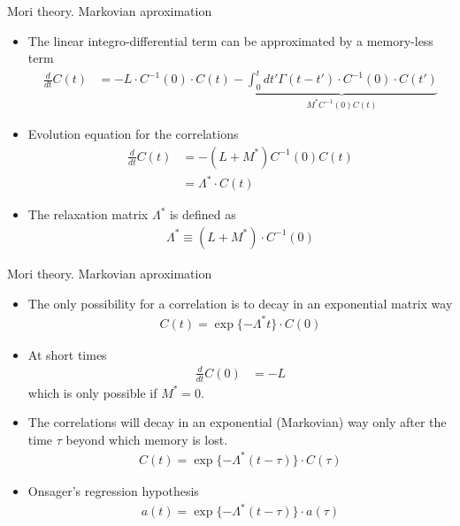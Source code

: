 \documentclass{beamer}
\newcommand{\esc}{\!\cdot\!}
\begin{document}
\begin{frame}{Mori theory. Markovian aproximation}
  \begin{itemize}
    \item The linear integro-differential term can be approximated by a memory-less term
      \begin{align}
  \frac{d}{dt}C(t)&=-L\esc C^{-1}(0)\esc C(t)
  -\underbrace{\int_0^tdt' \Gamma(t-t')\esc C^{-1}(0)\esc  C(t')}_{M^* C^{-1}(0)C(t)}
\nonumber
\end{align}
\item Evolution equation for the correlations
\begin{align}
  \frac{d}{dt}C(t)&=-(L+M^*)C^{-1}(0)C(t) 
  \nonumber \\
  &= \Lambda^*\esc  C(t)
\nonumber
\end{align}
\item The \alert{relaxation matrix} $\Lambda^*$ is defined as
\begin{align}
\Lambda^*\equiv(L+M^*)\esc C^{-1}(0)  
\nonumber
\end{align}
\end{itemize}
\end{frame}

\begin{frame}{Mori theory. Markovian aproximation}
  \begin{itemize}
    \item  The only possibility for a correlation is to \alert{decay in an exponential matrix way} 
\begin{align}
  C(t)=\exp\{-\Lambda^* t\}\esc C(0)
\nonumber
\end{align}
\item At short times 
\begin{align}
    \frac{d}{dt}C(0)&=-L
  \nonumber
\end{align}
which is only possible if $M^*=0$.
\item The correlations  will decay  in an
  exponential (Markovian)  way only  after the  time $\tau$  beyond which
memory is lost. 
\begin{align}
  C(t)=\exp\{-\Lambda^* (t-\tau)\}\esc C(\tau)
\nonumber
\end{align}
\item Onsager's regression hypothesis
\begin{align}
  a(t)=\exp\{-\Lambda^* (t-\tau)\}\esc a(\tau)
\nonumber
\end{align}
\end{itemize}
\end{frame}
\end{document}
